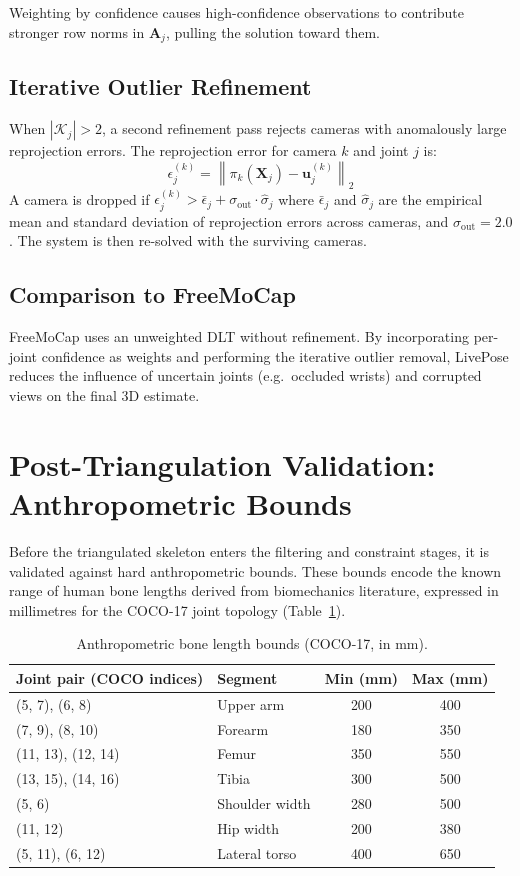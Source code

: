 \documentclass[11pt,a4paper]{article}
\newcommand{\norm}[1]{\left\lVert#1\right\rVert}
\begin{document}
Weighting by confidence causes high-confidence observations to contribute stronger
row norms in $\mathbf{A}_j$, pulling the solution toward them.

\subsection{Iterative Outlier Refinement}

When $|\mathcal{K}_j| > 2$, a second refinement pass rejects cameras with anomalously
large reprojection errors. The reprojection error for camera $k$ and joint $j$ is:
\[
  \epsilon^{(k)}_j = \norm{\pi_k(\mathbf{X}_j) - \mathbf{u}^{(k)}_j}_2
\]
A camera is dropped if $\epsilon^{(k)}_j > \bar{\epsilon}_j + \sigma_\text{out}
\cdot \hat{\sigma}_j$ where $\bar{\epsilon}_j$ and $\hat{\sigma}_j$ are the empirical
mean and standard deviation of reprojection errors across cameras, and
$\sigma_\text{out} = 2.0$. The system is then re-solved with the surviving cameras.

\subsection{Comparison to FreeMoCap}

FreeMoCap uses an unweighted DLT without refinement. By incorporating per-joint
confidence as weights and performing the iterative outlier removal, LivePose reduces
the influence of uncertain joints (e.g.\ occluded wrists) and corrupted views
on the final 3D estimate.

\section{Post-Triangulation Validation: Anthropometric Bounds}

Before the triangulated skeleton enters the filtering and constraint stages, it is
validated against hard anthropometric bounds. These bounds encode the known range of
human bone lengths derived from biomechanics literature, expressed in millimetres for
the COCO-17 joint topology (Table~\ref{tab:bounds}).

\begin{table}[ht]
\centering
\caption{Anthropometric bone length bounds (COCO-17, in mm).}
\label{tab:bounds}
\begin{tabular}{@{}llcc@{}}
\toprule
Joint pair (COCO indices) & Segment & Min (mm) & Max (mm) \\ \midrule
(5, 7), (6, 8) & Upper arm & 200 & 400 \\
(7, 9), (8, 10) & Forearm & 180 & 350 \\
(11, 13), (12, 14) & Femur & 350 & 550 \\
(13, 15), (14, 16) & Tibia & 300 & 500 \\
(5, 6) & Shoulder width & 280 & 500 \\
(11, 12) & Hip width & 200 & 380 \\
(5, 11), (6, 12) & Lateral torso & 400 & 650 \\
\bottomrule
\end{tabular}
\end{table}
\end{document}
